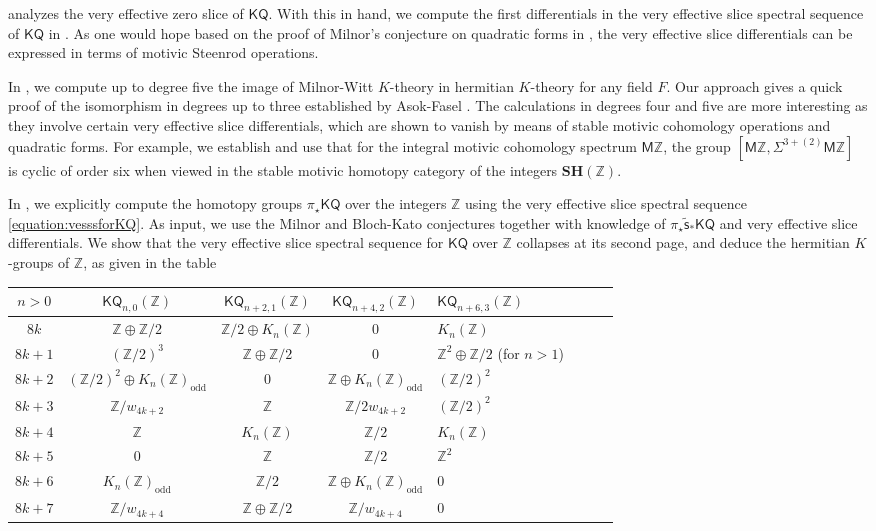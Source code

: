 \documentclass[11pt,hyp,english]{article}
\newcommand{\Z}{\mathbb{Z}}
\newcommand{\KQ}{\mathsf{KQ}}
\newcommand{\MZ}{\mathsf{M}\Z}
\newcommand{\SH}{\mathbf{SH}}
\newcommand{\vs}{\tilde{\mathsf{s}}}
\theoremstyle{definition}
\begin{document}
 analyzes the very effective zero slice of $\KQ$.
With this in hand, 
we compute the first differentials in the very effective 
slice spectral sequence of $\KQ$ in .
As one would hope based on the proof of Milnor's conjecture on quadratic forms in \cite{RO:slices},
the very effective slice differentials can be expressed in terms of motivic Steenrod operations.
\vspace{0.1in}

In , 
we compute up to degree five the image of Milnor-Witt $K$-theory in 
hermitian $K$-theory for any field $F$. 
Our approach gives a quick proof of the isomorphism in degrees up to three 
established by Asok-Fasel \cite{KO-map}.
The calculations in degrees four and five are more interesting as they involve 
certain very effective slice differentials, which are shown to vanish by means of 
stable motivic cohomology operations and quadratic forms.
For example, 
we establish and use that for the integral motivic cohomology spectrum $\MZ$,  
the group $[\MZ,\Sigma^{3+(2)}\MZ]$ is cyclic of order six when viewed in the 
stable motivic homotopy category of the integers $\SH(\Z)$.
\vspace{0.1in}

In , 
we explicitly compute the homotopy groups $\pi_{\star}\KQ$ over the integers $\mathbb{Z}$
using the very effective slice spectral sequence \eqref{equation:vesssforKQ}. 
As input, we use the Milnor and Bloch-Kato conjectures together with knowledge of 
$\pi_{\star}\vs_{\ast}\KQ$ and very effective slice differentials. 
We show that the very effective slice spectral sequence for $\KQ$ over $\mathbb{Z}$ 
collapses at its second page, 
and deduce the hermitian $K$-groups of $\mathbb{Z}$, as given in the table 
\begin{center}
 \begin{tabularx}{\textwidth}{c | c | c | c | l l l l} 
 \toprule
 $n>0$ 
 & $\KQ_{n,0}(\mathbb{Z})$ & $\KQ_{n+2,1}(\mathbb{Z})$ & $\KQ_{n+4,2}(\mathbb{Z})$ & $\KQ_{n+6,3}(\mathbb{Z})$ \\
 \midrule
$8k$ & $\mathbb{Z}\oplus\mathbb{Z}/2$ & $\Z/2\oplus K_n(\Z)$ & $0$  & $K_n(\Z)$ \\
$8k+1$ & $(\mathbb{Z}/2)^{3}$ & $\Z\oplus \Z/2$ & $0$ & $\Z^2\oplus \Z/2$ (for $n>1$)\\
$8k+2$ & $(\mathbb{Z}/2)^{2}\oplus K_{n}(\mathbb{Z})_{\text{odd}}$ & $0$ & $\Z\oplus K_{n}(\Z)_\mathrm{odd}$ & $(\Z/2)^2$\\
$8k+3$ & $\mathbb{Z}/w_{4k+2}$ & $\Z$ & $\Z/2w_{4k+2}$ & $(\Z/2)^2$ \\
$8k+4$ & $\mathbb{Z}$ & $K_n(\Z)$ & $\Z/2$ & $K_n(\Z)$ \\
$8k+5$ & $0$ & $\Z$ & $\Z/2$ & $\Z^2$\\
$8k+6$ & $K_{n}(\mathbb{Z})_{\text{odd}}$ & $\Z/2$& $\Z\oplus K_n(\Z)_{\mathrm{odd}}$ & $0$ \\
$8k+7$ & $\mathbb{Z}/w_{4k+4}$ & $\Z\oplus \Z/2$ & $\Z/w_{4k+4}$ & $0$ \\
\bottomrule
\end{tabularx}
\end{center}
\end{document}
